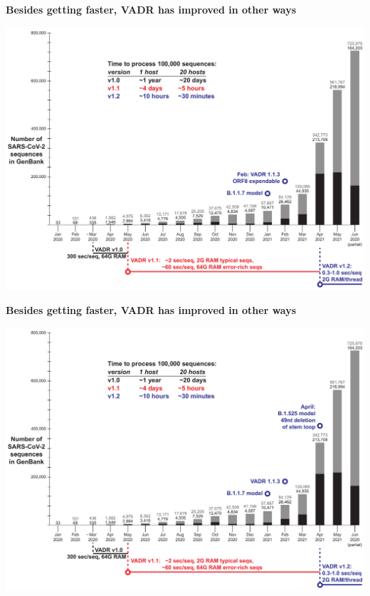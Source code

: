 \documentclass[landscape]{slides}
\begin{document}
\begin{slide}
\begin{center}
\textbf{Besides getting faster, VADR has improved in other ways}

\includegraphics[width=10.25in]{figs/sars-counts-jan2020-jun2021-slide5}

\end{center}

\vfill
\end{slide}
\begin{slide}
\begin{center}
\textbf{Besides getting faster, VADR has improved in other ways}

\includegraphics[width=10.25in]{figs/sars-counts-jan2020-jun2021-slide6}

\end{center}

\vfill
\end{slide}
\end{document}
